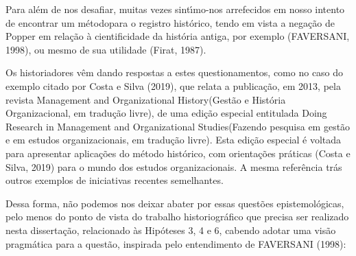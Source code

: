 \documentclass[
12pt,		%
openright,	%
twoside,  %
a4paper,			%
chapter=TITLE,		%
english,			%
french,				%
spanish,			%
brazil				%
]{USPSC-classe/USPSC}
\begin{document}
Para al\'em de nos desafiar, muitas vezes sint\'{\i}mo-nos arrefecidos em nosso intento de \textquotedbl encontrar um m\'etodo\textquotedbl  para o registro hist\'orico, tendo em vista a nega\c{c}\~ao de Popper em rela\c{c}\~ao \`a cientificidade da hist\'oria antiga, por exemplo (FAVERSANI, 1998), ou mesmo de sua utilidade (Firat, 1987).

















Os historiadores v\^em dando respostas a estes questionamentos, como no caso do exemplo citado por  Costa e Silva (2019), que relata a publica\c{c}\~ao, em 2013, pela revista \textquotedbl Management and Organizational History\textquotedbl  (\textquotedbl Gest\~ao e Hist\'oria Organizacional\textquotedbl , em tradu\c{c}\~ao livre), de uma edi\c{c}\~ao especial entitulada \textquotedbl Doing Research in Management and Organizational Studies\textquotedbl  (\textquotedbl Fazendo pesquisa em gest\~ao e em estudos organizacionais\textquotedbl , em tradu\c{c}\~ao livre). Esta edi\c{c}\~ao especial \'e voltada para apresentar aplica\c{c}\~oes do m\'etodo hist\'orico, com orienta\c{c}\~oes pr\'aticas  (Costa e Silva, 2019) para o mundo dos estudos organizacionais. A mesma refer\^encia tr\'as outros exemplos de iniciativas recentes semelhantes.

















Dessa forma, n\~ao podemos nos deixar abater por essas quest\~oes epistemol\'ogicas, pelo menos do ponto de vista do trabalho historiogr\'afico que precisa ser realizado nesta disserta\c{c}\~ao, relacionado \`as Hip\'oteses 3, 4 e 6, cabendo adotar uma vis\~ao pragm\'atica para a quest\~ao, inspirada pelo entendimento de FAVERSANI (1998):
\end{document}
